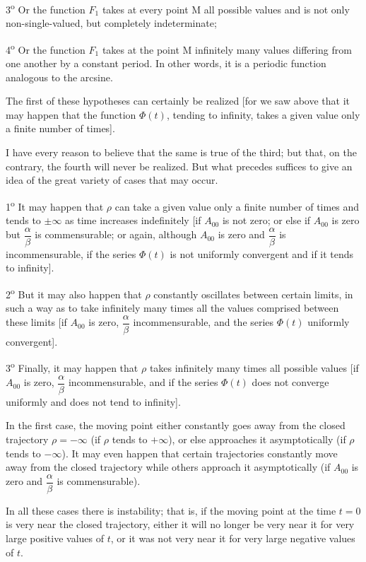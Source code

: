 \documentclass[11pt]{article}
\begin{document}
3\textsuperscript{o} Or the function $F_1$ takes at every point M all possible values and is not only non-single-valued, but completely indeterminate;

4\textsuperscript{o} Or the function $F_1$ takes at the point M infinitely many values differing from one another by a constant period. In other words, it is a periodic function analogous to the arcsine.

The first of these hypotheses can certainly be realized [for we saw above that it may happen that the function $\Phi(t)$, tending to infinity, takes a given value only a finite number of times].

I have every reason to believe that the same is true of the third; but that, on the contrary, the fourth will never be realized. But what precedes suffices to give an idea of the great variety of cases that may occur.

1\textsuperscript{o} It may happen that $\rho$ can take a given value only a finite number of times and tends to $\pm\infty$ as time increases indefinitely [if $A_{00}$ is not zero; or else if $A_{00}$ is zero but $\dfrac{\alpha}{\beta}$ is commensurable; or again, although $A_{00}$ is zero and $\dfrac{\alpha}{\beta}$ is incommensurable, if the series $\Phi(t)$ is not uniformly convergent and if it tends to infinity].

2\textsuperscript{o} But it may also happen that $\rho$ constantly oscillates between certain limits, in such a way as to take infinitely many times all the values comprised between these limits [if $A_{00}$ is zero, $\dfrac{\alpha}{\beta}$ incommensurable, and the series $\Phi(t)$ uniformly convergent].

3\textsuperscript{o} Finally, it may happen that $\rho$ takes infinitely many times all possible values [if $A_{00}$ is zero, $\dfrac{\alpha}{\beta}$ incommensurable, and if the series $\Phi(t)$ does not converge uniformly and does not tend to infinity].

In the first case, the moving point either constantly goes away from the closed trajectory $\rho=-\infty$ (if $\rho$ tends to $+\infty$), or else approaches it asymptotically (if $\rho$ tends to $-\infty$). It may even happen that certain trajectories constantly move away from the closed trajectory while others approach it asymptotically (if $A_{00}$ is zero and $\dfrac{\alpha}{\beta}$ is commensurable).

In all these cases there is instability; that is, if the moving point at the time $t=0$ is very near the closed trajectory, either it will no longer be very near it for very large positive values of $t$, or it was not very near it for very large negative values of $t$.
\end{document}
